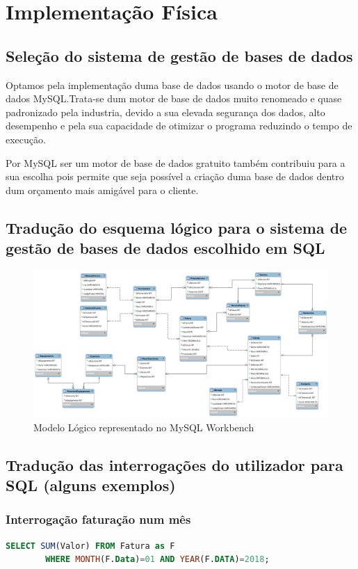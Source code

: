 \chapter{Implementação Física}
\section{Seleção do sistema de gestão de bases de dados}
Optamos pela implementação duma base de dados usando o motor de base de dados MySQL.Trata-se dum motor de base de dados muito renomeado e quase padronizado pela industria, devido a sua elevada segurança dos dados, alto desempenho e pela sua capacidade de otimizar o programa reduzindo o tempo de execução. \par 
Por MySQL ser um  motor de base de dados gratuito também contribuiu para a sua escolha pois permite que seja possível a criação duma base de dados dentro dum orçamento mais amigável para o cliente.

\clearpage

\section{Tradução do esquema lógico para o sistema de gestão de bases de dados escolhido em SQL}

\begin{figure}[h]
\centering
\includegraphics[width=\textwidth]{implementacao_fisica/ModeloLogico.png}
\caption{Modelo Lógico representado no MySQL Workbench}
\label{fig:mod_logico_mysql}
\end{figure}


\section{Tradução das interrogações do utilizador para SQL (alguns exemplos)}

\subsection{Interrogação faturação num mês}
\begin{lstlisting}[language=SQL]
    SELECT SUM(Valor) FROM Fatura as F
	    WHERE MONTH(F.Data)=01 AND YEAR(F.DATA)=2018; 
\end{lstlisting}

